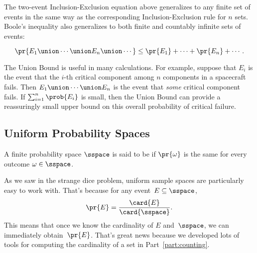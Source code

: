 The two-event Inclusion-Exclusion equation above generalizes to any
finite set of events in the same way as the corresponding
Inclusion-Exclusion rule for $n$ sets.  Boole's inequality also
generalizes to both finite and countably infinite sets of events:
\begin{rul}
\begin{equation}
    \pr{E_1 \union \cdots \union E_n \union \cdots} \leq \pr{E_1} + \cdots + \pr{E_n} + \cdots.
\end{equation}
\end{rul}
The Union Bound is useful in many calculations.  For example, suppose
that $E_i$ is the event that the $i$-th critical component among $n$
components in a spacecraft fails.  Then $E_1 \union \cdots \union E_n$
is the event that \emph{some} critical component fails.  If $\sum_{i =
  1}^n \prob{E_i}$ is small, then the Union Bound can provide a
reassuringly small upper bound on this overall probability of critical
failure.

\subsection{Uniform Probability Spaces}

\begin{definition}\label{def:uniform_pspace}
A finite probability space $\sspace$ is said to be  if
$\pr{\omega}$ is the same for every outcome $\omega \in \sspace$.
\end{definition}

As we saw in the strange dice problem, uniform sample spaces are
particularly easy to work with.  That's because for any event~$E
\subseteq \sspace$,
\begin{equation}\label{eqn:14G2}
    \pr{E} = \frac{\card{E}}{\card{\sspace}}.
\end{equation}
This means that once we know the cardinality of $E$ and~$\sspace$, we
can immediately obtain~$\pr{E}$.  That's great news because we
developed lots of tools for computing the cardinality of a set in
Part~\ref{part:counting}.

